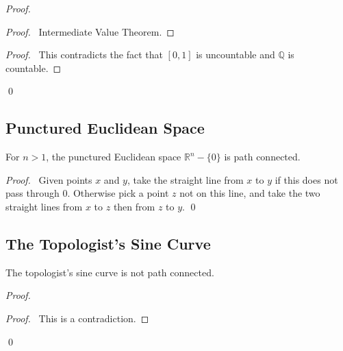 \begin{proof}
\pf
{}
\begin{proof}
	\pf\ Intermediate Value Theorem.
\end{proof}
\qedstep
\begin{proof}
	\pf\ This contradicts the fact that $[0,1]$ is uncountable and $\mathbb{Q}$ is countable.
\end{proof}
\qed
\end{proof}

\subsection{Punctured Euclidean Space}

\begin{prop}
For $n > 1$, the punctured Euclidean space $\mathbb{R}^n - \{0\}$ is path connected.
\end{prop}

\begin{proof}
\pf\ Given points $x$ and $y$, take the straight line from $x$ to $y$ if this does not pass through 0. Otherwise pick a point $z$ not on this line, and take the two straight lines from $x$ to $z$ then from $z$ to $y$. \qed
\end{proof}

\subsection{The Topologist's Sine Curve}

\begin{prop}
The topologist's sine curve is not path connected.
\end{prop}

\begin{proof}
\pf
{}
\qedstep
\begin{proof}
	\pf\ This is a contradiction.
\end{proof}
\qed
\end{proof}

